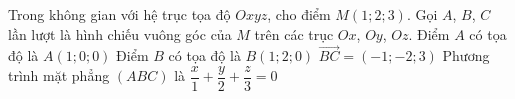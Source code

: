 \begin{ex}%
	Trong không gian với hệ trục tọa độ $Oxyz$, cho điểm $M(1;2;3)$. Gọi $A$, $B$, $C$ lần lượt là hình chiếu vuông góc của $M$ trên các trục $Ox$, $Oy$, $Oz$.
	\choiceTF
	{\True Điểm $A$ có tọa độ là $A\left(1;0;0\right)$}
	{Điểm $B$ có tọa độ là $B\left(1;2;0\right)$}
	{$\overrightarrow{BC}=(-1;-2;3)$}
	{Phương trình mặt phẳng $(ABC)$ là $\dfrac{x}{1}+\dfrac{y}{2}+\dfrac{z}{3}=0$}
\end{ex}